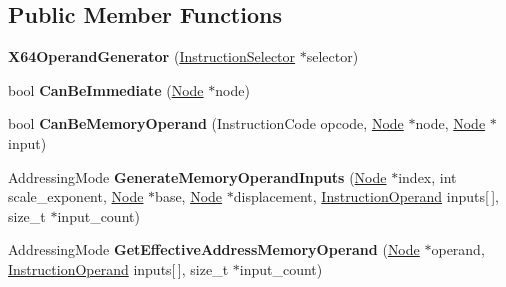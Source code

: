 \subsection*{Public Member Functions}
\begin{DoxyCompactItemize}
\item 
{\bfseries X64\+Operand\+Generator} (\hyperlink{classv8_1_1internal_1_1compiler_1_1_instruction_selector}{Instruction\+Selector} $\ast$selector)\hypertarget{classv8_1_1internal_1_1compiler_1_1_x64_operand_generator_a2f123c8b3f3c98fe340ac808feaca428}{}\label{classv8_1_1internal_1_1compiler_1_1_x64_operand_generator_a2f123c8b3f3c98fe340ac808feaca428}

\item 
bool {\bfseries Can\+Be\+Immediate} (\hyperlink{classv8_1_1internal_1_1compiler_1_1_node}{Node} $\ast$node)\hypertarget{classv8_1_1internal_1_1compiler_1_1_x64_operand_generator_aeea6d01288b05aa78636fbdb60b06200}{}\label{classv8_1_1internal_1_1compiler_1_1_x64_operand_generator_aeea6d01288b05aa78636fbdb60b06200}

\item 
bool {\bfseries Can\+Be\+Memory\+Operand} (Instruction\+Code opcode, \hyperlink{classv8_1_1internal_1_1compiler_1_1_node}{Node} $\ast$node, \hyperlink{classv8_1_1internal_1_1compiler_1_1_node}{Node} $\ast$input)\hypertarget{classv8_1_1internal_1_1compiler_1_1_x64_operand_generator_add480722f07769548ac3a0f6f2a4a0b5}{}\label{classv8_1_1internal_1_1compiler_1_1_x64_operand_generator_add480722f07769548ac3a0f6f2a4a0b5}

\item 
Addressing\+Mode {\bfseries Generate\+Memory\+Operand\+Inputs} (\hyperlink{classv8_1_1internal_1_1compiler_1_1_node}{Node} $\ast$index, int scale\+\_\+exponent, \hyperlink{classv8_1_1internal_1_1compiler_1_1_node}{Node} $\ast$base, \hyperlink{classv8_1_1internal_1_1compiler_1_1_node}{Node} $\ast$displacement, \hyperlink{classv8_1_1internal_1_1compiler_1_1_instruction_operand}{Instruction\+Operand} inputs\mbox{[}$\,$\mbox{]}, size\+\_\+t $\ast$input\+\_\+count)\hypertarget{classv8_1_1internal_1_1compiler_1_1_x64_operand_generator_a73abe0e4a0e7a9886352ec3b368d689b}{}\label{classv8_1_1internal_1_1compiler_1_1_x64_operand_generator_a73abe0e4a0e7a9886352ec3b368d689b}

\item 
Addressing\+Mode {\bfseries Get\+Effective\+Address\+Memory\+Operand} (\hyperlink{classv8_1_1internal_1_1compiler_1_1_node}{Node} $\ast$operand, \hyperlink{classv8_1_1internal_1_1compiler_1_1_instruction_operand}{Instruction\+Operand} inputs\mbox{[}$\,$\mbox{]}, size\+\_\+t $\ast$input\+\_\+count)\hypertarget{classv8_1_1internal_1_1compiler_1_1_x64_operand_generator_aa794b876b7305b077a2ad11adbc153e3}{}\label{classv8_1_1internal_1_1compiler_1_1_x64_operand_generator_aa794b876b7305b077a2ad11adbc153e3}


\end{DoxyCompactItemize}
